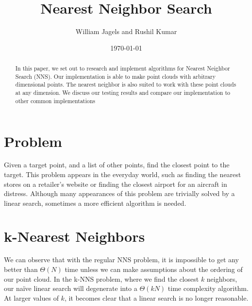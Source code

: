\documentclass[a4paper,12pt,twocolumn]{article}
\title{Nearest Neighbor Search}
\author{William Jagels and Rushil Kumar}
\date{\today}
\begin{document}
\maketitle

\begin{abstract}
  In this paper, we set out to research and implement algorithms for Nearest Neighbor Search (NNS).
  Our implementation is able to make point clouds with arbitrary dimensional points.
  The nearest neighbor is also suited to work with these point clouds at any dimension.
  We discuss our testing results and compare our implementation to other common implementations
\end{abstract}

\section{Problem}
Given a target point, and a list of other points, find the closest point to the target.
This problem appears in the everyday world, such as finding the nearest stores on a
retailer's website or finding the closest airport for an aircraft in distress.
Although many appearances of this problem are trivially solved by a linear search,
sometimes a more efficient algorithm is needed.

\section{k-Nearest Neighbors}
We can observe that with the regular NNS problem, it is impossible to get any better than
$\Theta(N)$ time unless we can make assumptions about the ordering of our point cloud.
In the k-NNS problem, where we find the closest $k$ neighbors, our naïve linear search
will degenerate into a $\Theta(kN)$ time complexity algorithm.
At larger values of $k$, it becomes clear that a linear search is no longer reasonable.
\end{document}
